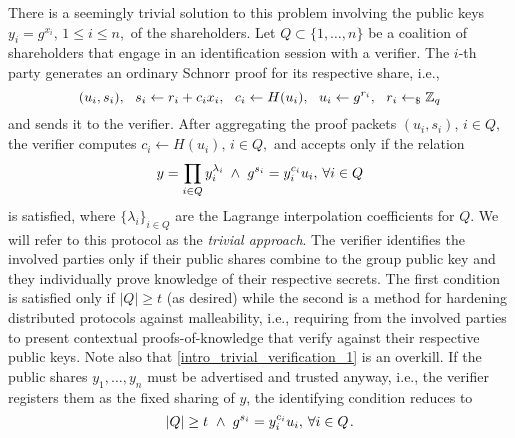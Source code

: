 \documentclass{iacrtrans}
\begin{document}
There is a seemingly trivial solution to this problem
involving the public keys
$y_i = g ^ {x_i},\hspace{2pt} 1 \le i \le n,$
of the shareholders.
Let $Q \subset \{1, \dots, n\}$
be a coalition of shareholders that engage in
an identification session with a verifier.
The $i$-th party generates
an ordinary Schnorr proof
for its respective share, i.e.,
\vspace{5pt}
\begin{equation*}
(u_i, s_i),
\ \ s_i \leftarrow r_i + c_i x_i,
\ \ c_i \leftarrow H(u_i),
\ \ u_i \leftarrow g ^ {r_i},
\ \ r_i \leftarrow_\$ \mathbb{Z}_q
\vspace{5pt}
\end{equation*}
and sends it to the verifier.
After aggregating the proof packets
$(u_i, s_i),\hspace{2pt}i \in Q,$
the verifier computes
$c_i \leftarrow H(u_i),\hspace{2pt} i \in Q,$
and accepts only if the relation
\vspace{5pt}
\begin{equation}\label{intro_trivial_verification_1}
y = \prod_{i \in Q} y_i ^{\lambda_i}
\hspace{2.50pt}
\land
\hspace{3pt}
g ^ {s_i} = y_i ^ {c_i} u_i,
\hspace{2pt}
\forall i \in Q
\vspace{5pt}
\end{equation}
is satisfied, where $\{\lambda_i\}_{i \in Q}$ are the
Lagrange interpolation coefficients for $Q$.
We will refer to this protocol as the \textit{trivial approach}.
The verifier identifies the involved parties only if
their public shares combine to the group public key
and they individually prove knowledge of their respective secrets.
The first condition is satisfied only if $|Q| \ge t$ (as desired)
while the second is a method for hardening
distributed protocols against malleability, i.e.,
requiring from the involved parties
to present contextual proofs-of-knowledge
that verify against their respective public keys.
Note also that \eqref{intro_trivial_verification_1} is an overkill.
If the public shares $y_1, \dots, y_n$
must be advertised and trusted anyway,
i.e., the verifier registers them as the fixed sharing of $y$,
the identifying condition reduces to
\vspace{5pt}
\begin{equation}\label{intro_trivial_verification_2}
|Q| \ge t
\hspace{3.50pt}
\land
\hspace{3pt}
g ^ {s_i} = y_i ^ {c_i} u_i,
\hspace{2pt}
\forall i \in Q
\hspace{1pt}.
\vspace{5pt}
\end{equation}
\end{document}
